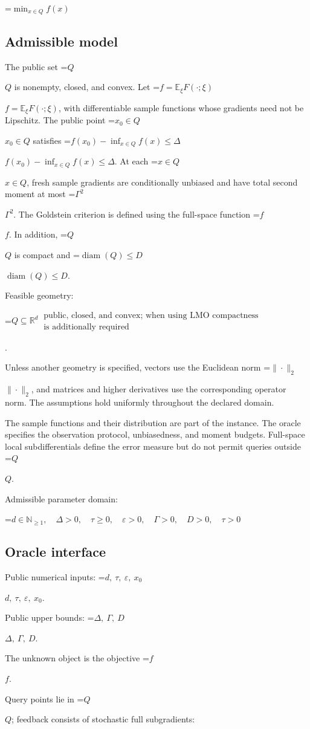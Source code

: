 \documentclass[10pt,a4paper]{article}
\newcommand{\AtlasMath}[1]{\par\begingroup\centering\setbox0=\hbox{$\displaystyle #1$}\ifdim\wd0>1.4\linewidth\typeout{ATLAS WIDE FORMULA: \the\wd0}\fi\ifdim\wd0>\linewidth\resizebox{\linewidth}{!}{\box0}\else\box0\fi\par\endgroup}
\newcommand{\AtlasInlineMath}[1]{\begingroup\setbox0=\hbox{$#1$}\ifdim\wd0>.4\linewidth\endgroup\AtlasMath{#1}\else\endgroup$#1$\fi}
\begin{document}
\AtlasMath{\min_{x\in Q}f(x)}


\subsection{Admissible model}
The public set \AtlasInlineMath{Q} is nonempty, closed, and convex. Let \AtlasInlineMath{f=\mathbb E_\xi F(\cdot;\xi)}, with differentiable sample functions whose gradients need not be Lipschitz. The public point \AtlasInlineMath{x_0\in Q} satisfies \AtlasInlineMath{f(x_0)-\inf_{x\in Q}f(x)\le\Delta}. At each \AtlasInlineMath{x\in Q}, fresh sample gradients are conditionally unbiased and have total second moment at most \AtlasInlineMath{\Gamma^2}. The Goldstein criterion is defined using the full-space function \AtlasInlineMath{f}. In addition, \AtlasInlineMath{Q} is compact and \AtlasInlineMath{\operatorname{diam}(Q)\le D}.

Feasible geometry: 
\AtlasMath{Q\subseteq\mathbb{R}^d\ \substack{\text{public, closed, and convex;  when using LMO compactness}\\\text{is additionally required}}}
.

Unless another geometry is specified, vectors use the Euclidean norm \AtlasInlineMath{\|\cdot\|_2}, and matrices and higher derivatives use the corresponding operator norm. The assumptions hold uniformly throughout the declared domain.

The sample functions and their distribution are part of the instance. The oracle specifies the observation protocol, unbiasedness, and moment budgets. Full-space local subdifferentials define the error measure but do not permit queries outside \AtlasInlineMath{Q}.

Admissible parameter domain:


\AtlasMath{d\in\mathbb{N}_{\ge1},\quad \Delta>0,\quad \tau\ge0,\quad \varepsilon>0,\quad \Gamma>0,\quad D>0,\quad \tau>0}


\subsection{Oracle interface}
Public numerical inputs: \AtlasInlineMath{d,\ \tau,\ \varepsilon,\ x_0}.

Public upper bounds: \AtlasInlineMath{\Delta,\ \Gamma,\ D}.

The unknown object is the objective \AtlasInlineMath{f}.

Query points lie in \AtlasInlineMath{Q}; feedback consists of stochastic full subgradients:
\end{document}
